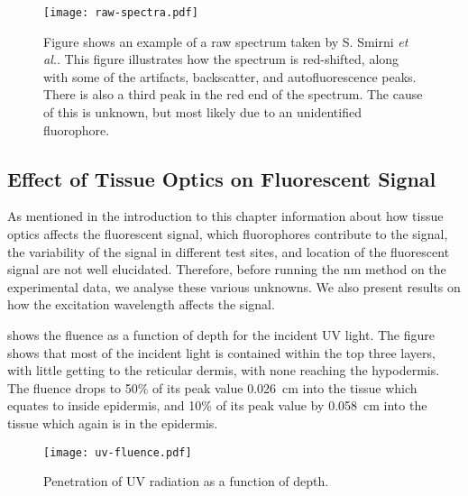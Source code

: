 \begin{figure}[!htpb]
  \centering
  \texttt{[image: raw-spectra.pdf]}
  \caption{Figure shows an example of a raw spectrum taken by S. Smirni \textit{et al.}. This figure illustrates how the spectrum is red-shifted, along with some of the artifacts, backscatter, and autofluorescence peaks. There is also a third peak in the red end of the spectrum. The cause of this is unknown, but most likely due to an unidentified fluorophore.}
  \label{fig:slavodataexample}
\end{figure}

\subsection{Effect of Tissue Optics on Fluorescent Signal}

As mentioned in the introduction to this chapter information about how tissue optics affects the fluorescent signal, which fluorophores contribute to the signal, the variability of the signal in different test sites, and location of the fluorescent signal are not well elucidated. 
Therefore, before running the \gls*{nm} method on the experimental data, we analyse these various unknowns.
We also present results on how the excitation wavelength affects the signal.

 shows the fluence as a function of depth for the incident UV light.
The figure shows that most of the incident light is contained within the top three layers, with little getting to the reticular dermis, with none reaching the hypodermis.
The fluence drops to 50\% of its peak value 0.026~cm into the tissue which equates to inside epidermis, and 10\% of its peak value by 0.058~cm into the tissue which again is in the epidermis.

\begin{figure}[!htpb]
    \centering
    \texttt{[image: uv-fluence.pdf]}
    \caption{Penetration of UV radiation as a function of depth.}
    \label{fig:uvpen}
\end{figure}

